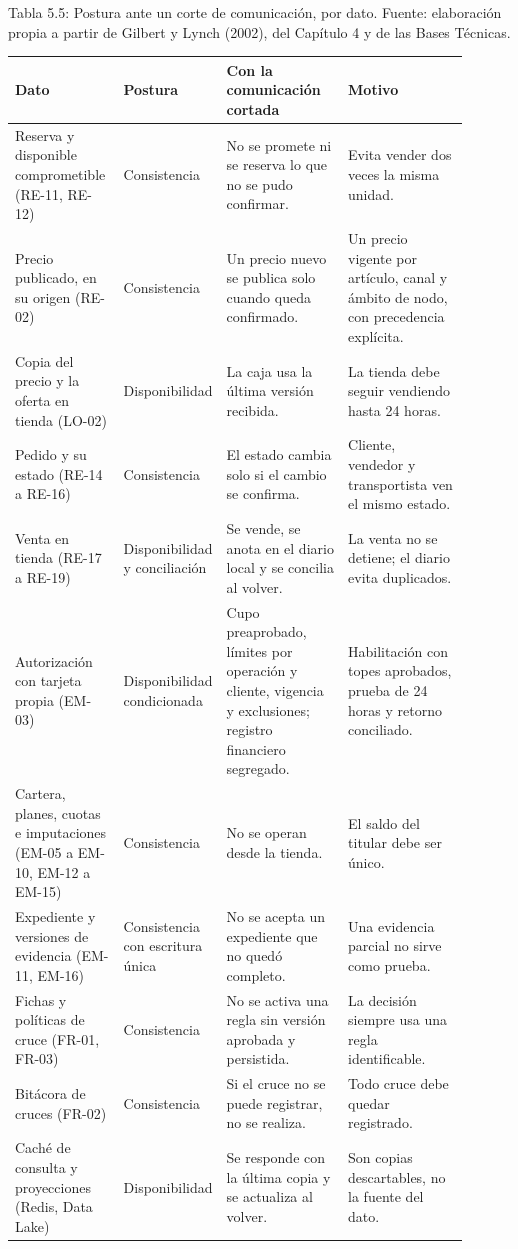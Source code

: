 \documentclass[11pt]{article}
\begin{document}
Tabla 5.5: Postura ante un corte de comunicación, por dato. Fuente: elaboración propia a partir de Gilbert y Lynch (2002), del Capítulo 4 y de las Bases Técnicas.\label{tab:t10}\par\nopagebreak
\begin{longtable}{@{}p{0.241\linewidth}p{0.106\linewidth}p{0.278\linewidth}p{0.278\linewidth}@{}}
\toprule Dato & Postura & Con la comunicación cortada & Motivo \\
\midrule\endhead\bottomrule\endlastfoot
Reserva y disponible comprometible (RE-11, RE-12) & Consistencia & No se promete ni se reserva lo que no se pudo confirmar. & Evita vender dos veces la misma unidad. \\
Precio publicado, en su origen (RE-02) & Consistencia & Un precio nuevo se publica solo cuando queda confirmado. & Un precio vigente por artículo, canal y ámbito de nodo, con precedencia explícita. \\
Copia del precio y la oferta en tienda (LO-02) & Disponibilidad & La caja usa la última versión recibida. & La tienda debe seguir vendiendo hasta 24 horas. \\
Pedido y su estado (RE-14 a RE-16) & Consistencia & El estado cambia solo si el cambio se confirma. & Cliente, vendedor y transportista ven el mismo estado. \\
Venta en tienda (RE-17 a RE-19) & Disponibilidad y conciliación & Se vende, se anota en el diario local y se concilia al volver. & La venta no se detiene; el diario evita duplicados. \\
Autorización con tarjeta propia (EM-03) & Disponibilidad condicionada & Cupo preaprobado, límites por operación y cliente, vigencia y exclusiones; registro financiero segregado. & Habilitación con topes aprobados, prueba de 24 horas y retorno conciliado. \\
Cartera, planes, cuotas e imputaciones (EM-05 a EM-10, EM-12 a EM-15) & Consistencia & No se operan desde la tienda. & El saldo del titular debe ser único. \\
Expediente y versiones de evidencia (EM-11, EM-16) & Consistencia con escritura única & No se acepta un expediente que no quedó completo. & Una evidencia parcial no sirve como prueba. \\
Fichas y políticas de cruce (FR-01, FR-03) & Consistencia & No se activa una regla sin versión aprobada y persistida. & La decisión siempre usa una regla identificable. \\
Bitácora de cruces (FR-02) & Consistencia & Si el cruce no se puede registrar, no se realiza. & Todo cruce debe quedar registrado. \\
Caché de consulta y proyecciones (Redis, Data Lake) & Disponibilidad & Se responde con la última copia y se actualiza al volver. & Son copias descartables, no la fuente del dato. \\
\end{longtable}
\end{document}
